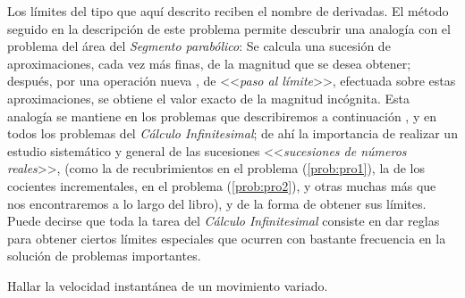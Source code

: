 Los límites del tipo que aquí descrito reciben el nombre de derivadas.
El método seguido en la descripción de este problema permite descubrir
una analogía con el problema del área del \textsl{Segmento parabólico}:
Se calcula una sucesión de aproximaciones, cada vez más finas, de
la magnitud que se desea obtener; después, por una operación nueva
, de <<\textsl{paso al límite}>>, efectuada sobre estas aproximaciones,
se obtiene el valor exacto de la magnitud incógnita. Esta analogía
se mantiene en los problemas que describiremos a continuación , y
en todos los problemas del \textsl{Cálculo Infinitesimal}; de ahí
la importancia de realizar un estudio sistemático y general de las
sucesiones <<\textsl{sucesiones de números reales}>>, (como la de
recubrimientos en el problema (\ref{prob:pro1}), la de los cocientes
incrementales, en el problema (\ref{prob:pro2}), y otras muchas más
que nos encontraremos a lo largo del libro), y de la forma de obtener
sus límites. Puede decirse que toda la tarea del \textsl{Cálculo Infinitesimal}
consiste en dar reglas para obtener ciertos límites especiales que
ocurren con bastante frecuencia en la solución de problemas importantes.

\begin{problema}\label{prob:pro3} 

Hallar la velocidad instantánea de un movimiento variado.

\end{problema}

